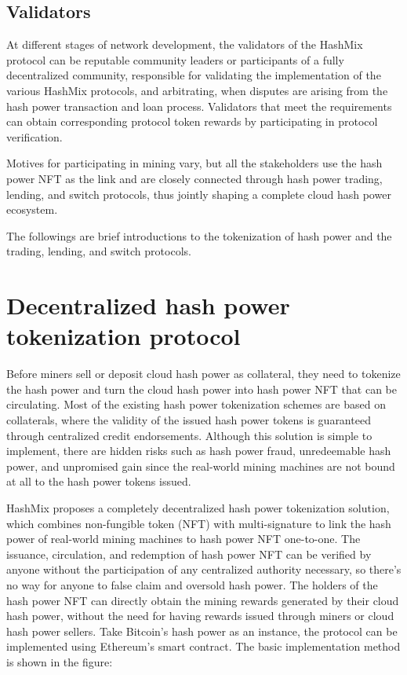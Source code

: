 \documentclass[]{template/llncs}
\begin{document}
\subsection{Validators}

At different stages of network development, the validators of the HashMix protocol can be reputable community leaders or participants of a fully decentralized community, responsible for validating the implementation of the various HashMix protocols, and arbitrating, when disputes are arising from the hash power transaction and loan process. Validators that meet the requirements can obtain corresponding protocol token rewards by participating in protocol verification.

Motives for participating in mining vary, but all the stakeholders use the hash power NFT as the link and are closely connected through hash power trading, lending, and switch protocols, thus jointly shaping a complete cloud hash power ecosystem.

The followings are brief introductions to the tokenization of hash power and the trading, lending, and switch protocols.

\section{Decentralized hash power tokenization protocol}

Before miners sell or deposit cloud hash power as collateral, they need to tokenize the hash power and turn the cloud hash power into hash power NFT that can be circulating. Most of the existing hash power tokenization schemes are based on collaterals, where the validity of the issued hash power tokens is guaranteed through centralized credit endorsements. Although this solution is simple to implement, there are hidden risks such as hash power fraud, unredeemable hash power, and unpromised gain since the real-world mining machines are not bound at all to the hash power tokens issued.

HashMix proposes a completely decentralized hash power tokenization solution, which combines non-fungible token (NFT) with multi-signature to link the hash power of real-world mining machines to hash power NFT one-to-one. The issuance, circulation, and redemption of hash power NFT can be verified by anyone without the participation of any centralized authority necessary, so there’s no way for anyone to false claim and oversold hash power. The holders of the hash power NFT can directly obtain the mining rewards generated by their cloud hash power, without the need for having rewards issued through miners or cloud hash power sellers. Take Bitcoin's hash power as an instance, the protocol can be implemented using Ethereum's smart contract. The basic implementation method is shown in the figure:
\end{document}
